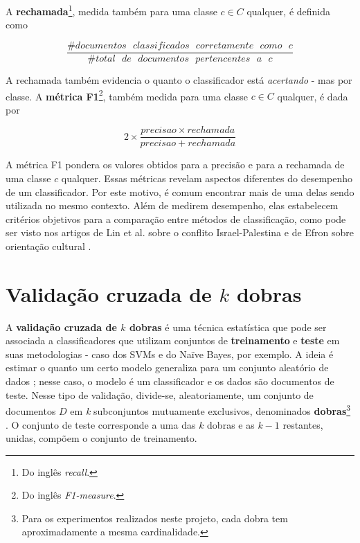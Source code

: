 A \textbf{rechamada}\footnote{Do inglês \emph{recall}.}, medida também para uma classe \ensuremath{c \in C} qualquer, é definida como \cite{manning}

\begin{equation}
\label{recall}
\ensuremath{\frac{\#documentos\mbox{ }classificados\mbox{ }corretamente\mbox{ }como\mbox{ }c}{\#total\mbox{ }de\mbox{ }documentos\mbox{ }pertencentes\mbox{ }a\mbox{ }c}}
\end{equation}

A rechamada também evidencia o quanto o classificador está \emph{acertando} - mas por classe. A \textbf{métrica F1}\footnote{Do inglês \emph{F1-measure}.}, também medida para uma classe \ensuremath{c \in C} qualquer, é dada por \cite{manning}

\begin{equation}
\label{f1measure}
\ensuremath{2 \times \frac{precisao \times rechamada}{precisao + rechamada}}
\end{equation} 


A métrica F1 pondera os valores obtidos para a precisão e para a rechamada de uma classe \ensuremath{c} qualquer. Essas métricas revelam aspectos diferentes do desempenho de um classificador. Por este motivo, é comum encontrar mais de uma delas sendo utilizada no mesmo contexto. Além de medirem desempenho, elas estabelecem critérios objetivos para a comparação entre métodos de classificação, como pode ser visto nos artigos de Lin et al. sobre o conflito Israel-Palestina \cite{lin-et-al2006} e de Efron sobre orientação cultural \cite{efron}. 


\section{Validação cruzada de \ensuremath{k} dobras}
\label{validacao}

A \textbf{validação cruzada de \ensuremath{k} dobras} é uma técnica estatística que pode ser associada a classificadores que utilizam conjuntos de \textbf{treinamento} e \textbf{teste} em suas metodologias - caso dos SVMs e do Naïve Bayes, por exemplo. A ideia é estimar o quanto um certo modelo generaliza para um conjunto aleatório de dados \cite{payam-leitang}; nesse caso, o modelo é um classificador e os dados são documentos de teste. Nesse tipo de validação, divide-se, aleatoriamente, um conjunto de documentos \ensuremath{D} em \emph{k} subconjuntos mutuamente exclusivos, denominados \textbf{dobras}\footnote{Para os experimentos realizados neste projeto, cada dobra tem aproximadamente a mesma cardinalidade.} \cite{ron-kohavi}. O conjunto de teste corresponde a uma das \ensuremath{k} dobras e as \ensuremath{k - 1} restantes, unidas, compõem o conjunto de treinamento.

